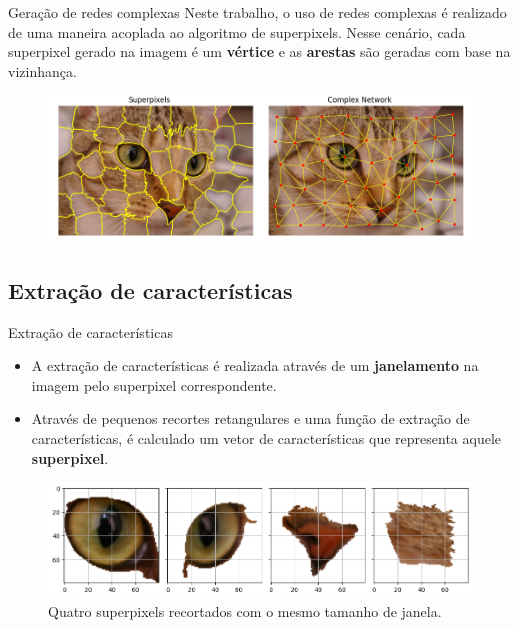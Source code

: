 \documentclass{templatebeamerufc/libs/ufc_format}
\begin{document}
\begin{frame}{Geração de redes complexas}
  Neste trabalho, o uso de redes complexas é realizado de uma maneira
acoplada ao algoritmo de superpixels. Nesse cenário, cada superpixel
gerado na imagem é um \textbf{vértice} e as \textbf{arestas} são
geradas com base na vizinhança.

   \begin{figure}\label{fig:complex-networks-simplified}
     \centering
        \includegraphics[scale=0.32]{figuras/complex-networks-simplified}
   \end{figure}
\end{frame}

\subsection{Extração de características}
\begin{frame}{Extração de características}
  \begin{itemize}
  \item A extração de características é realizada através de um
    \textbf{janelamento} na imagem pelo superpixel correspondente.
  \item Através de pequenos recortes retangulares e uma função de
extração de características, é calculado um vetor de características
que representa aquele \textbf{superpixel}.
  \end{itemize}

  \begin{figure}\label{fig:superpixels-feature-extraction}
    \centering
    \caption{Quatro superpixels recortados com o mesmo tamanho de janela.}
    \includegraphics[scale=0.4]{figuras/superpixels-feature-extraction}
  \end{figure}

\end{frame}
\end{document}
